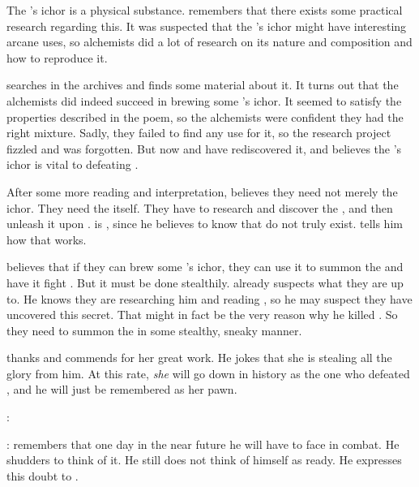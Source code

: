 The \Chimaera's ichor is a physical substance.
\Urizeth remembers that there exists some practical research regarding this.
It was suspected that the \Chimaera's ichor might have interesting arcane uses, so alchemists did a lot of research on its nature and composition and how to reproduce it.

\Urizeth searches in the archives and finds some material about it.
It turns out that the alchemists did indeed succeed in brewing some \Chimaera's ichor.
It seemed to satisfy the properties described in the poem, so the alchemists were confident they had the right mixture.
Sadly, they failed to find any use for it, so the research project fizzled and was forgotten.
But now \Urizeth and \Teshrial have rediscovered it, and \Urizeth believes the \Chimaera's ichor is vital to defeating \Ishnaruchaefir.

After some more reading and interpretation, \Urizeth believes they need not merely the ichor.
They need the \malgryph itself.
They have to research and discover the , and then unleash it upon \Ishnaruchaefir.
\Teshrial is \skeptical, since he believes to know that \malgryphs do not truly exist. 
\Urizeth tells him how that works. 

\Urizeth believes that if they can brew some \Chimaera's ichor, they can use it to summon the \malgryph and have it fight \Ishnaruchaefir.
But it must be done stealthily. 
\Ishnaruchaefir already suspects what they are up to.
He knows they are researching him and reading \WanderersInDarknessEmph, so he may suspect they have uncovered this secret. 
That might in fact be the very reason why he killed \Urizeth.
So they need to summon the \malgryph in some stealthy, sneaky manner. 

\Teshrial thanks and commends \Urizeth for her great work. 
He jokes that she is stealing all the glory from him.
At this rate, \emph{she} will go down in history as the one who defeated \Ishnaruchaefir, and he will just be remembered as her pawn. 

\Urizeth: 

\Teshrial:
\Teshrial remembers that one day in the near future he will have to face \Ishnaruchaefir in combat. 
He shudders to think of it.
He still does not think of himself as ready. 
He expresses this doubt to \Urizeth.

